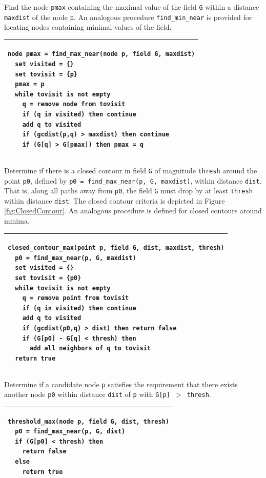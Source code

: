 \documentclass[gmdd, hvmath, online]{copernicus_discussions}
\begin{document}
\begin{algorithm}
\caption{Find the node \texttt{pmax} containing the maximal value of the field \texttt{G} within a distance \texttt{maxdist} of the node \texttt{p}.  An analogous procedure \texttt{find\_min\_near} is provided for locating nodes containing minimal values of the field.\ \\} \label{alg:find_max_near}
\noindent \begin{tabular}{p{5in}}
\hline \small \begin{verbatim}
node pmax = find_max_near(node p, field G, maxdist)
  set visited = {}
  set tovisit = {p}
  pmax = p
  while tovisit is not empty
    q = remove node from tovisit
    if (q in visited) then continue
    add q to visited
    if (gcdist(p,q) > maxdist) then continue
    if (G[q] > G[pmax]) then pmax = q
\end{verbatim} \\
\hline
\end{tabular}
\end{algorithm}

\begin{algorithm}
\caption{Determine if there is a closed contour in field \texttt{G} of magnitude \texttt{thresh} around the point \texttt{p0}, defined by \texttt{p0 = find\_max\_near(p, G, maxdist)}, within distance \texttt{dist}.  That is, along all paths away from \texttt{p0}, the field \texttt{G} must drop by at least \texttt{thresh} within distance \texttt{dist}.  The closed contour criteria is depicted in Figure \ref{fig:ClosedContour}.  An analogous procedure is defined for closed contours around minima.\ \\} \label{alg:closed_contour_max}
\noindent \begin{tabular}{p{5in}}
\hline \small \begin{verbatim}
closed_contour_max(point p, field G, dist, maxdist, thresh)
  p0 = find_max_near(p, G, maxdist)
  set visited = {}
  set tovisit = {p0}
  while tovisit is not empty
    q = remove point from tovisit
    if (q in visited) then continue
    add q to visited
    if (gcdist(p0,q) > dist) then return false
    if (G[p0] - G[q] < thresh) then
      add all neighbors of q to tovisit
  return true
\end{verbatim} \\
\hline
\end{tabular}
\end{algorithm}

\begin{algorithm}
\caption{Determine if a candidate node \texttt{p} satisfies the requirement that there exists another node \texttt{p0} within distance \texttt{dist} of \texttt{p} with \texttt{G[p] $>$ thresh}.\ \\} \label{alg:threshold_max}
\noindent \begin{tabular}{p{5in}}
\hline \small \begin{verbatim}
threshold_max(node p, field G, dist, thresh)
  p0 = find_max_near(p, G, dist)
  if (G[p0] < thresh) then
    return false
  else
    return true
\end{verbatim} \\
\hline
\end{tabular}
\end{algorithm}
\end{document}
